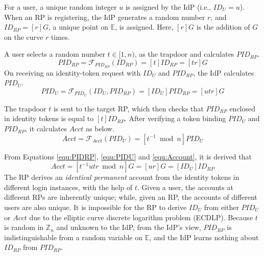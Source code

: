 For a user,
           a unique random integer $u$ is assigned by the IdP (i.e., $ID_U = u$).
When an RP is registering,
            the IdP generates a random number $r$, and $ID_{RP} = [r]G$, a unique point on $\mathbb{E}$, is assigned.
Here,
 $[r]G$ is the addition of $G$ on the curve $r$ times.

\vspace{0.5mm}
 A user selects a random number $t \in [1, n)$, as the trapdoor
         and calculates $PID_{RP}$.
\begin{equation}
PID_{RP} = \mathcal{F}_{PID_{RP}}(ID_{RP}) = [t]{ID_{RP}} = [tr]G
\label{equ:PIDRP}
\end{equation}
On receiving an identity-token request with $ID_U$ and $PID_{RP}$,
    the IdP calculates $PID_{U}$.
\begin{equation}
PID_{U} = \mathcal{F}_{PID_U}(ID_U, PID_{RP}) =
  [{ID_U}]{PID_{RP}} = [utr]G
 \label{equ:PIDU}
\end{equation}


The trapdoor $t$ is sent to the target RP,
which then checks that $PID_{RP}$ enclosed in identity tokens is equal to $[t]ID_{RP}$.
After verifying a token binding $PID_U$ and $PID_{RP}$,
    it calculates $Acct$ as below.
\begin{equation}
Acct = \mathcal{F}_{Acct}(PID_{U})
   = [t^{-1} \bmod n]PID_{U}
   \label{equ:Account}
\end{equation}

From Equations \ref{equ:PIDRP}, \ref{equ:PIDU} and \ref{equ:Account}, it is derived that
\begin{equation*}
   Acct =  [t^{-1}utr \bmod n]G = [ur]G = [ID_U]ID_{RP}
   \label{equ:AccountNotChanged}
\end{equation*}
The RP derives an \emph{identical permanent} account from the identity tokens in different login instances,
    with the help of $t$. %
Given a user, the accounts at different RPs are inherently unique;
while, given an RP, the accounts of different users are also unique.
It is impossible for the RP to derive $ID_U$ from either $PID_U$ or $Acct$ due to the elliptic curve discrete logarithm problem (ECDLP).
Because $t$ is random in $\mathbb{Z}_n$ and unknown to the IdP,
from the IdP's view,
    $PID_{RP}$ is indistinguishable from a random variable on $\mathbb{E}$,
    and the IdP learns nothing about $ID_{RP}$ from $PID_{RP}$.

